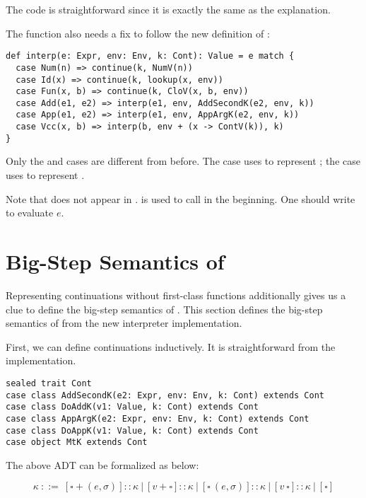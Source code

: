 The code is straightforward since it is exactly the same as the explanation.

The  function also needs a fix to follow the new definition of
:

\begin{verbatim}
def interp(e: Expr, env: Env, k: Cont): Value = e match {
  case Num(n) => continue(k, NumV(n))
  case Id(x) => continue(k, lookup(x, env))
  case Fun(x, b) => continue(k, CloV(x, b, env))
  case Add(e1, e2) => interp(e1, env, AddSecondK(e2, env, k))
  case App(e1, e2) => interp(e1, env, AppArgK(e2, env, k))
  case Vcc(x, b) => interp(b, env + (x -> ContV(k)), k)
}
\end{verbatim}

Only the  and  cases are different from before. The  case
uses  to represent ; the  case uses  to represent .

Note that  does not appear in .  is used to
call  in the beginning. One should write  to evaluate $e$.

\section{Big-Step Semantics of \Lang}

Representing continuations without first-class functions additionally gives us a clue to
define the big-step semantics of \Lang. This section defines
the big-step semantics of \Lang from the new interpreter implementation.

First, we can define continuations inductively.
It is straightforward from the implementation.

\begin{verbatim}
sealed trait Cont
case class AddSecondK(e2: Expr, env: Env, k: Cont) extends Cont
case class DoAddK(v1: Value, k: Cont) extends Cont
case class AppArgK(e2: Expr, env: Env, k: Cont) extends Cont
case class DoAppK(v1: Value, k: Cont) extends Cont
case object MtK extends Cont
\end{verbatim}

The above ADT can be formalized as below:

\[
\kappa\ ::=\ [\square+(e,\sigma)]::\kappa
\ |\ [v+\square]::\kappa
\ |\ [\square\ (e,\sigma)]::\kappa
\ |\ [v\ \square]::\kappa
\ |\ [\square]
\]

